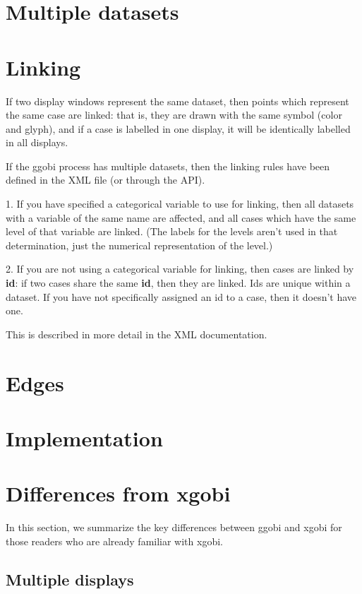 \documentclass[11pt]{article}
\begin{document}
\section{Multiple datasets}

\section{Linking}
\label{LinkingRules}

If two display windows represent the same dataset, then points which
represent the same case are linked:  that is, they are drawn with the
same symbol (color and glyph), and if a case is labelled in one
display, it will be identically labelled in all displays.

If the ggobi process has multiple datasets, then the linking rules
have been defined in the XML file (or through the API).

1.  If you have specified a categorical variable to use for linking,
then all datasets with a variable of the same name are affected, and
all cases which have the same level of that variable are linked.
(The labels for the levels aren't used in that determination, just
the numerical representation of the level.)

2.  If you are not using a categorical variable for linking, then
cases are linked by {\bf id}: if two cases share the same {\bf id},
then they are linked.   Ids are unique within a dataset.  If you have
not specifically assigned an id to a case, then it doesn't have one.

This is described in more detail in the XML documentation.

\section{Edges}

\section{Implementation}

\newpage
\section{Differences from xgobi}
\label{slbl:xgobi}

In this section, we summarize the key differences between ggobi
and xgobi for those readers who are already familiar with xgobi.

\subsection {Multiple displays}
\end{document}
